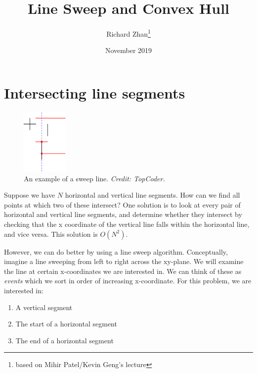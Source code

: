 \documentclass{article}
\title{Line Sweep and Convex Hull}
\author{Richard Zhan\footnote{based on Mihir Patel/Kevin Geng's lecture}}
\date{November 2019}
\begin{document}
\maketitle


\section{Intersecting line segments}


\begin{figure}
  \vspace{-30pt}
  \begin{center}
    \includegraphics[width=0.20\textwidth]{linesvh.png}
  \end{center}
  \vspace{-10pt}
  \caption{An example of a sweep line. \textit{Credit: TopCoder.}}
  \vspace{-20pt}
\end{figure}

Suppose we have $N$ horizontal and vertical line segments. How can we find all points at which two of these intersect? One solution is to look at every pair of horizontal and vertical line segments, and determine whether they intersect by checking that the x coordinate of the vertical line falls within the horizontal line, and vice versa. This solution is $O(N^2)$.

However, we can do better by using a line sweep algorithm. Conceptually, imagine a line sweeping from left to right across the xy-plane. We will examine the line at certain x-coordinates we are interested in. We can think of these as \textit{events} which we sort in order of increasing x-coordinate. For this problem, we are interested in:

\begin{enumerate}
    \itemsep 0em
    \item A vertical segment
    \item The start of a horizontal segment
    \item The end of a horizontal segment
\end{enumerate}
\end{document}
